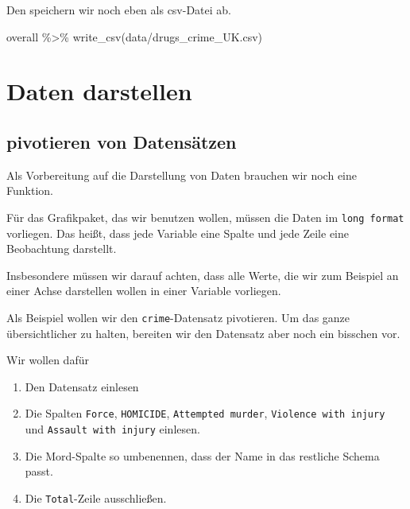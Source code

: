 \documentclass[
]{book}
\newenvironment{Shaded}{\begin{snugshade}}{\end{snugshade}}
\newcommand{\FunctionTok}[1]{\textcolor[rgb]{0.00,0.00,0.00}{#1}}
\newcommand{\NormalTok}[1]{#1}
\newcommand{\SpecialCharTok}[1]{\textcolor[rgb]{0.00,0.00,0.00}{#1}}
\newcommand{\StringTok}[1]{\textcolor[rgb]{0.31,0.60,0.02}{#1}}
\providecommand{\tightlist}{%
  \setlength{\itemsep}{0pt}\setlength{\parskip}{0pt}}
\begin{document}
Den speichern wir noch eben als csv-Datei ab.

\begin{Shaded}
\begin{Highlighting}[]
\NormalTok{overall }\SpecialCharTok{\%\textgreater{}\%} \FunctionTok{write\_csv}\NormalTok{(}\StringTok{\textquotesingle{}data/drugs\_crime\_UK.csv\textquotesingle{}}\NormalTok{)}
\end{Highlighting}
\end{Shaded}

\hypertarget{daten-darstellen}{%
\chapter{Daten darstellen}\label{daten-darstellen}}

\hypertarget{pivotieren-von-datensuxe4tzen}{%
\section{pivotieren von Datensätzen}\label{pivotieren-von-datensuxe4tzen}}

Als Vorbereitung auf die Darstellung von Daten brauchen wir noch eine Funktion.

Für das Grafikpaket, das wir benutzen wollen, müssen die Daten im \texttt{long\ format} vorliegen. Das heißt, dass jede Variable eine Spalte und jede Zeile eine Beobachtung darstellt.

Insbesondere müssen wir darauf achten, dass alle Werte, die wir zum Beispiel an einer Achse darstellen wollen in einer Variable vorliegen.

Als Beispiel wollen wir den \texttt{\textquotesingle{}crime\textquotesingle{}}-Datensatz pivotieren. Um das ganze übersichtlicher zu halten, bereiten wir den Datensatz aber noch ein bisschen vor.

Wir wollen dafür

\begin{enumerate}
\def\labelenumi{\arabic{enumi}.}
\tightlist
\item
  Den Datensatz einlesen
\item
  Die Spalten \texttt{Force}, \texttt{HOMICIDE}, \texttt{Attempted\ murder}, \texttt{Violence\ with\ injury} und \texttt{Assault\ with\ injury} einlesen.
\item
  Die Mord-Spalte so umbenennen, dass der Name in das restliche Schema passt.
\item
  Die \texttt{Total}-Zeile ausschließen.
\end{enumerate}
\end{document}
